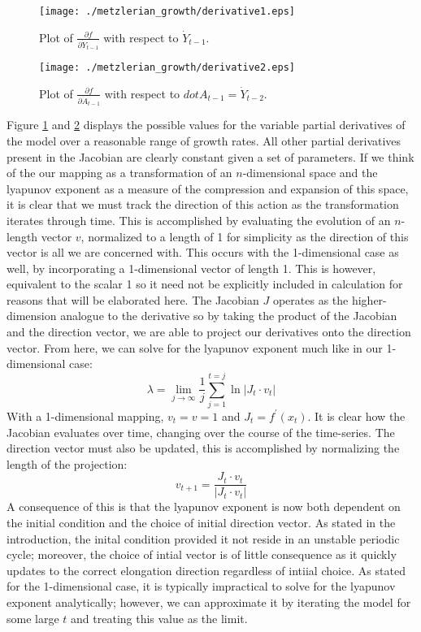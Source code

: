 \begin{figure}
    \centering
    \texttt{[image: ./metzlerian\_growth/derivative1.eps]}
    \caption{Plot of $\frac{\partial f}{\partial \dot Y_{t-1}}$ with respect to $\dot Y_{t-1}$.}
    \label{derivative1}
\end{figure}

\begin{figure}
    \centering
    \texttt{[image: ./metzlerian\_growth/derivative2.eps]}
    \caption{Plot of $\frac{\partial f}{\partial \dot A_{t-1}}$ with respect to $dot A_{t-1}=\dot Y_{t-2}$.}
    \label{derivative2}
\end{figure}

Figure \ref{derivative1} and \ref{derivative2} displays the possible values for the variable partial derivatives of the model over a reasonable range of growth rates. All other partial derivatives present in the Jacobian are clearly constant given a set of parameters. If we think of the our mapping as a transformation of an $n$-dimensional space and the lyapunov exponent as a measure of the compression and expansion of this space, it is clear that we must track the direction of this action as the transformation iterates through time. This is accomplished by evaluating the evolution of an $n$-length vector $v$, normalized to a length of 1 for simplicity as the direction of this vector is all we are concerned with. This occurs with the 1-dimensional case as well, by incorporating a 1-dimensional vector of length 1. This is however, equivalent to the scalar 1 so it need not be explicitly included in calculation for reasons that will be elaborated here. The Jacobian $J$ operates as the higher-dimension analogue to the derivative so by taking the product of the Jacobian and the direction vector, we are able to project our derivatives onto the direction vector. From here, we can solve for the lyapunov exponent much like in our 1-dimensional case:
\begin{equation}
    \lambda = \lim_{j\to\infty}\frac{1}{j}\sum^{t=j}_{j=1}\ln\lvert J_t\cdot v_t\rvert
\end{equation}
With a 1-dimensional mapping, $v_t=v=1$ and $J_t=f^\prime(x_t)$. It is clear how the Jacobian evaluates over time, changing over the course of the time-series. The direction vector must also be updated, this is accomplished by normalizing the length of the projection:
\begin{equation}
    v_{t+1}=\frac{J_t\cdot v_t}{\lvert J_t\cdot v_t\rvert}
\end{equation}
A consequence of this is that the lyapunov exponent is now both dependent on the initial condition and the choice of initial direction vector. As stated in the introduction, the inital condition provided it not reside in an unstable periodic cycle; moreover, the choice of intial vector is of little consequence as it quickly updates to the correct elongation direction regardless of intiial choice. As stated for the 1-dimensional case, it is typically impractical to solve for the lyapunov exponent analytically; however, we can approximate it by iterating the model for some large $t$ and treating this value as the limit.

